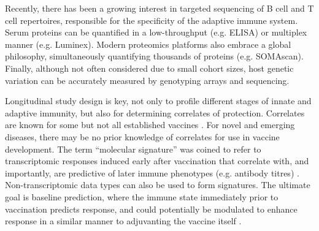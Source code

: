 Recently, there has been a growing interest in targeted sequencing of B cell and T cell repertoires, responsible for the specificity of the adaptive immune system.
Serum proteins can be quantified in a low-throughput (e.g. \gls{ELISA}) or multiplex manner (e.g. Luminex).
Modern proteomics platforms also embrace a global philosophy, simultaneously quantifying thousands of proteins (e.g. SOMAscan). 
Finally, although not often considered due to small cohort sizes, host genetic variation can be accurately measured by genotyping arrays and sequencing. 
%
%

Longitudinal study design is key, not only to profile different stages of innate and adaptive immunity, but also for determining correlates of protection.
Correlates are known for some but not all established vaccines \autocite{siegrist2018VaccineImmunology,plotkin2018CorrelatesProtection}.
For novel and emerging diseases, there may be no prior knowledge of correlates for use in vaccine development.
The term \enquote{molecular signature} was coined to refer to transcriptomic responses induced early after vaccination that correlate with, and importantly, are predictive of later immune phenotypes (e.g. antibody titres) \autocite{pulendran2010SystemsVaccinology}.
Non-transcriptomic data types can also be used to form signatures.
The ultimate goal is baseline prediction, where the immune state immediately prior to vaccination predicts response, 
and could potentially be modulated to enhance response in a similar manner to adjuvanting the vaccine itself \autocite{tsang2020ImprovingVaccineinducedImmunity}. 

